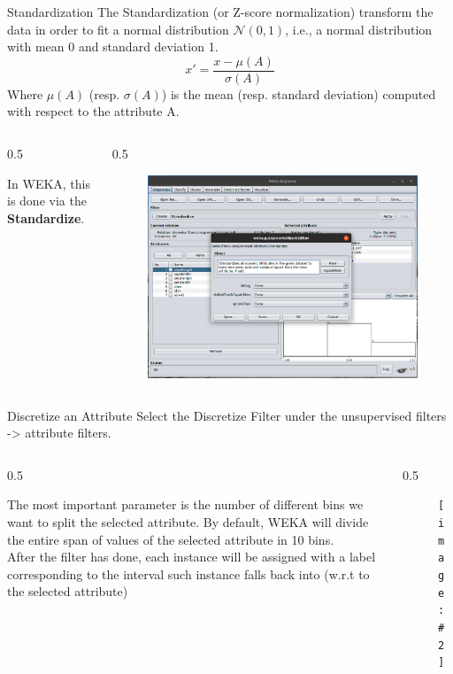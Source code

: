 \documentclass{beamer}
\newcommand{\cols}[4]{
	\begin{columns}[t]
	\begin{column}{#1\textwidth}
		#3
	\end{column}
	\begin{column}{#2\textwidth}
		#4
	\end{column}
	\end{columns}
	
}
\newcommand{\fig}[2]{
	\begin{figure}[!h]
	\texttt{[image: \#2]}
	\end{figure}
}
\begin{document}
\begin{frame}{Standardization}
The Standardization (or Z-score normalization) 
transform the data in order to fit a normal distribution
$\mathcal{N}(0,1)$, i.e., a normal distribution with
mean 0 and standard deviation 1.
\[
	x' = \frac{x-\mu(A)}{\sigma(A)}
\]
Where $\mu(A)$ (resp. $\sigma(A)$)
is the mean (resp. standard deviation) computed with respect to the
attribute A.
\cols{0.5}{0.5}{

In WEKA, this is done via the \textbf{Standardize}.
}
{
\begin{figure}[t]
\includegraphics[scale=0.12]{img/standardize.png}
\end{figure}
}
\end{frame}





\begin{frame}[t]{Discretize an Attribute}
Select the Discretize Filter under the \textsf{unsupervised filters -> attribute filters}.
\cols{0.5}{0.5}{
	The most important parameter is the number of different bins we want to split
	the selected attribute. By default, WEKA will divide the entire span of values
	of the selected attribute in 10 bins.\\
	After the filter has done, each instance will be assigned with a label corresponding
	to the interval such instance falls back into (w.r.t to the selected attribute)
	
}
{
\fig{0.8}{img/discrete.png}
}
\end{frame}
\end{document}
